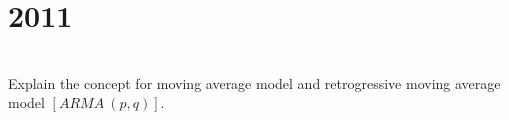 \section*{2011}
\vspace{-.5cm}
\hrulefill \smallskip\\
 Explain the concept for moving average model and retrogressive moving average model $[ARMA\:(p,q)].$
